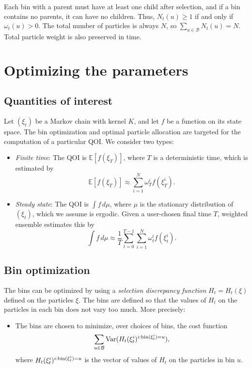 \documentclass[11pt,letterpaper]{amsart}
\theoremstyle{plain}
\theoremstyle{definition}
\numberwithin{equation}{section}
\begin{document}
Each bin with a parent 
must have at least 
one child after selection, and if a bin 
contains no parents, 
it can have no children. Thus, $N_t(u) \ge 1$
if and only if $\omega_t(u)>0$. The total number of particles is always $N$, 
so $\sum_{u \in {\mathcal B}}N_t(u) = N$. 
Total particle weight is also preserved in time.



\section{Optimizing the parameters}


\subsection{Quantities of interest}

Let
$(\xi_t)$ be a Markov chain with kernel $K$, and let
$f$ be a function on its state space. The bin optimization and optimal particle allocation 
are targeted for the computation of a particular 
QOI. We 
consider two types:
\begin{itemize}
\item[] {\em Finite time}: The QOI is ${\mathbb E}[f(\xi_T)]$, where $T$ is a deterministic time, which is estimated by
$${\mathbb E}[f(\xi_T)] \approx \sum_{i=1}^N \omega_T^i f(\xi_T^i).$$
\item[]{\em Steady state}: The QOI is $\int f\,d\mu$, where 
$\mu$ is the stationary distribution of $(\xi_t)$, which we assume is ergodic. Given a user-chosen final time $T$, weighted ensemble estimates this by
$$\int f \,d\mu \approx \frac{1}{T}\sum_{t=0}^{T-1}\sum_{i=1}^N \omega_t^i f(\xi_t^i).$$
\end{itemize}

\subsection{Bin optimization}

The bins can be optimized by using a  
{\em selection 
discrepancy function} $H_t = H_t(\xi)$ defined on 
the particles $\xi$. 
The bins are defined so that the values 
of $H_t$ on the particles in each 
bin does not vary too much. More precisely: 
\begin{itemize}
\item The bins are chosen to minimize, over choices of bins, the cost function
$$\sum_{u \in {\mathcal B}} \textup{Var}(H_t(\xi_t^i)^{i:\textup{bin}(\xi_t^i) = u}),$$
where $H_t(\xi_t^i)^{i:\textup{bin}(\xi_t^i) = u}$ is the vector of values of $H_t$ on the particles in bin $u$.
\end{itemize}
\end{document}

